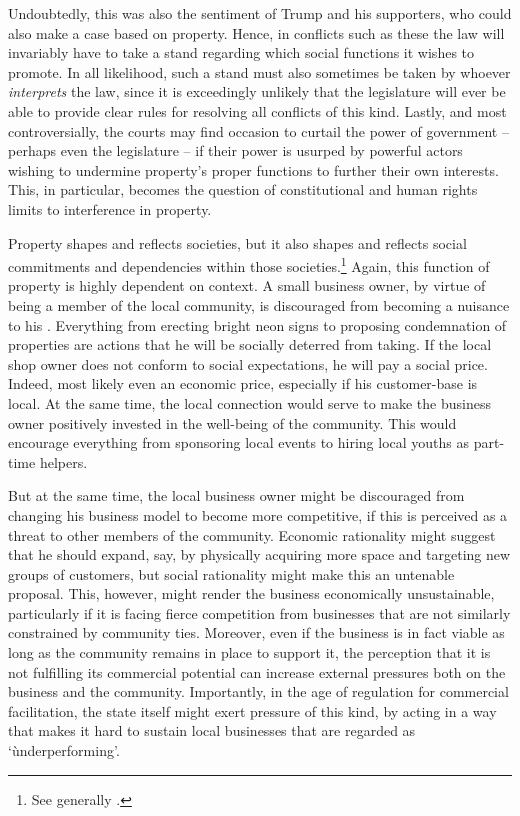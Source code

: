 Undoubtedly, this was also the sentiment of Trump and his supporters, who could also make a case based on property. Hence, in conflicts such as these the law will invariably have to take a stand regarding which social functions it wishes to promote. In all likelihood, such a stand must also sometimes be taken by whoever {\it interprets} the law, since it is exceedingly unlikely that the legislature will ever be able to provide clear rules for resolving all conflicts of this kind. Lastly, and most controversially, the courts may find occasion to curtail the power of government -- perhaps even the legislature -- if their power is usurped by powerful actors wishing to undermine property's proper functions to further their own interests. This, in particular, becomes the question of constitutional and human rights limits to interference in property.

Property shapes and reflects societies, but it also shapes and reflects social commitments and dependencies within those societies.\footnote{See generally \cite{alexander09}.} Again, this function of property is highly dependent on context. A small business owner, by virtue of being a member of the local community, is discouraged from becoming a nuisance to his . Everything from erecting bright neon signs to proposing condemnation of  properties are actions that he will be socially deterred from taking. If the local shop owner does not conform to social expectations, he will pay a social price. Indeed, most likely even an economic price, especially if his customer-base is local. At the same time, the local connection would serve to make the business owner positively invested in the well-being of the community. This would encourage everything from sponsoring local events to hiring local youths as part-time helpers.

But at the same time, the local business owner might be discouraged from changing his business model to become more competitive, if this is perceived as a threat to other members of the community. Economic rationality might suggest that he should expand, say, by physically acquiring more space and targeting new groups of customers, but social rationality might make this an untenable proposal. This, however, might render the business economically unsustainable, particularly if it is facing fierce competition from businesses that are not similarly constrained by community ties. Moreover, even if the business is in fact viable as long as the community remains in place to support it, the perception that it is not fulfilling its commercial potential can increase external pressures both on the business and the community. Importantly, in the age of regulation for commercial facilitation, the state itself might  exert pressure of this kind, by acting in a way that makes it hard to sustain local businesses that are regarded as `ùnderperforming'.

